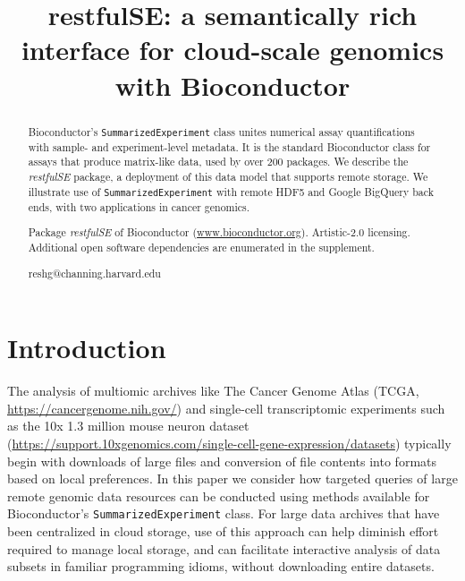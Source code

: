 \documentclass[applications]{gen-bioinformatics}
\author[1]{\pfnm{Shweta}
  \pinit{}
  \psnm{Gopaulakrishnan}}
\author[1]{\pfnm{Samuela}
  \pinit{}
  \psnm{Pollack}}
\author[1]{\pfnm{Benjamin}
  \pinit{}
  \psnm{Stubbs}}
\author[2]{\pfnm{Herv\'e}
  \pinit{}
  \psnm{Pag\`es}}
\author[3]{\pfnm{John}
  \pinit{}
  \psnm{Readey}}
\author[4]{\pfnm{Sean}
  \pinit{}
  \psnm{Davis}}
\author[5]{\pfnm{Levi}
  \pinit{}
  \psnm{Waldron}}
\author[6]{\pfnm{Martin}
  \pinit{T}
  \psnm{Morgan}}
\author[1]{\pfnm{Vincent}
  \pinit{J}
  \psnm{Carey}}
\newcommand{\Biocpackage}[1]{{\textit{#1}}}
\newcommand{\BiocpackageFirst}[1]{{\textit{#1}}}
\begin{document}
\title{restfulSE: a semantically rich interface for cloud-scale genomics
with Bioconductor}
\maketitle

\begin{abstract}
\begin{subabstract}[Summary]
Bioconductor's \texttt{SummarizedExperiment} class unites numerical
assay quantifications with sample- and experiment-level metadata.  
It is the standard Bioconductor class for assays that
produce matrix-like data, used by over 200 packages.
We describe the \Biocpackage{restfulSE} package, a deployment of 
this data model that supports
remote storage.
We illustrate use of
\texttt{SummarizedExperiment} with remote HDF5 and Google
BigQuery back ends, with two applications in cancer genomics.
\end{subabstract}
\begin{subabstract}[Availability] Package \BiocpackageFirst{restfulSE} of Bioconductor
 (\url {www.bioconductor.org}).  Artistic-2.0 licensing.  Additional
open software dependencies are enumerated in the supplement.
\end{subabstract}
\begin{subabstract}[Contact]reshg@channing.harvard.edu
\end{subabstract}
\end{abstract}
\section*{Introduction}

The analysis of multiomic archives like The Cancer Genome Atlas (TCGA, \url{https://cancergenome.nih.gov/})
and single-cell transcriptomic experiments such as the 10x 1.3 million
mouse neuron dataset (\url{https://support.10xgenomics.com/single-cell-gene-expression/datasets}) typically begin with downloads of large files and
conversion of file contents into formats based on local preferences.
In this paper we consider how targeted queries of large remote genomic
data resources can be conducted using methods available for
Bioconductor's \texttt{SummarizedExperiment} class.  
For large data archives that have been centralized
in cloud storage, use of this approach can help diminish effort
required to manage local storage,
and can facilitate interactive analysis of data
subsets in familiar programming idioms, 
without downloading entire datasets. 
\end{document}
